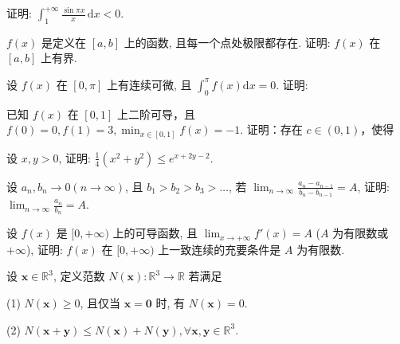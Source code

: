 证明: $\int_{1}^{+\infty} \frac{\sin \pi x}{x} \, \mathrm{d}x < 0$.\par
$f(x)$ 是定义在 $[a, b]$ 上的函数, 且每一个点处极限都存在. 证明: $f(x)$ 在 $[a, b]$ 上有界.\par
\par{}
设 $f(x)$ 在 $[0, \pi]$ 上有连续可微, 且 $\int_0^\pi f(x) \mathrm{d}x = 0$. 证明:\par
\nopagebreak[4]
\par{}
已知 $f(x)$ 在 $[0,1]$ 上二阶可导，且 $f(0) = 0, f(1) = 3, \min_{x \in [0,1]} f(x) = -1$. 证明：存在 $c \in (0,1)$，使得\par
\nopagebreak[4]
设 $x, y > 0$, 证明: $\frac{1}{4} (x^2 + y^2) \leq e^{x + 2y - 2}$.\par
设 $a_{n}, b_{n} \to 0 (n \to \infty)$, 且 $b_{1} > b_{2} > b_{3} > \dots$, 若 $\lim_{n \to \infty} \frac{a_{n} - a_{n-1}}{b_{n} - b_{n-1}} = A$, 证明: $\lim_{n \to \infty} \frac{a_{n}}{b_{n}} = A$.\par
设 $f(x)$ 是 $[0, +\infty)$ 上的可导函数, 且 $\lim_{x \to +\infty} f'(x) = A$ ($A$ 为有限数或 $+\infty$), 证明: $f(x)$ 在 $[0, +\infty)$ 上一致连续的充要条件是 $A$ 为有限数.\par
设 $\pmb{x} \in \mathbb{R}^3$, 定义范数 $N(\pmb{x}) : \mathbb{R}^3 \to \mathbb{R}$ 若满足\par
(1) $N(\pmb{x}) \geq 0$, 且仅当 $\pmb{x} = \pmb{0}$ 时, 有 $N(\pmb{x}) = 0$.\par
(2) $N(\pmb {x} + \pmb{y})\leq N(\pmb {x}) + N(\pmb {y}),\forall \pmb {x},\pmb {y}\in \mathbb{R}^{3}.$\par
